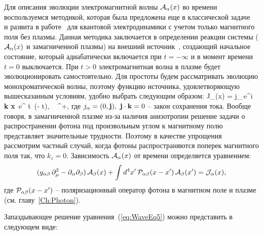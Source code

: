 Для описания эволюции электромагнитной волны ${\cal A}_{\alpha}(x)$ 
во времени воспользуемся методикой, которая была предложена еще в классической 
задаче~\cite{Landau:1946} и развита  в работе~\cite{MikhChist:2001} для 
квантовой электродинамики с учетом только магнитного поля без плазмы. Данная 
методика заключается в определении реакции системы 
(${\cal A}_{\alpha}(x)$ и замагниченной плазмы) на внешний источник~\cite{Kirzhnits:1987}, создающий начальное состояние, который адиабатически включается 
при $t = - \infty$ и в момент времени $t = 0$ выключается. При $t > 0$
электромагнитная волна в плазме будет эволюционировать самостоятельно. Для простоты будем рассматривать эволюцию монохроматической волны, поэтому 
функцию источника, удовлетворяющую вышесказанным условиям, удобно выбрать следующим образом:
%
\beq
{\cal J}_{\alpha}(x) = j_{\alpha}\,e^{i \,{\bf k} {\bf x}}\,
e^{ \varepsilon t}\, \theta(- t), \,\,\, \varepsilon {}^+,
\label{eq:1}
\eeq
где $j_{\alpha} = (0, {\bf j}),\,\,{\bf j} \cdot {\bf k} = 0$ – закон 
сохранения тока. Вообще говоря, в замагниченной плазме из-за наличия 
анизотропии решение задачи о распространении фотона под произвольным углом к 
магнитному полю представляет значительные трудности. Поэтому в качестве 
упрощения рассмотрим частный случай, когда фотоны распространяются поперек 
магнитного поля так, что $k_z=0$. Зависимость ${\cal A}_{\alpha}(x)$ от 
времени  определяется уравнением:
%
\begin{eqnarray}\label{eq:WaveEq5}
(g_{\alpha \beta} \, \partial_{\mu}^2  -
\partial_{\alpha}\partial_{\beta}) \, {\cal A}_{\beta}(x) + 
\int d^4 x'\, {\cal P}_{\alpha \beta} (x - x') \, {\cal A}_{\beta}(x')
= {\cal J}_{\alpha}(x),
\label{eq:2}
\end{eqnarray}
где ${\cal P}_{\alpha \beta} (x - x')$ -- поляризационный оператор фотона в 
магнитном поле и плазме (см. главу~\ref{Ch:Photon}).



Запаздывающее решение уравнения~(\ref{eq:WaveEq5}) можно представить в 
следующем виде:

